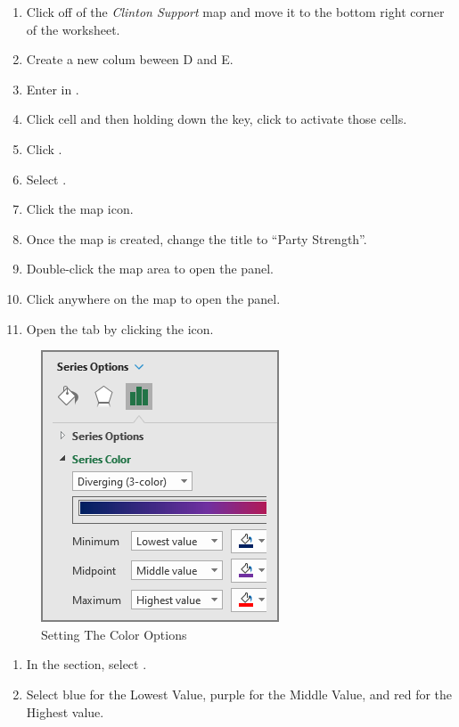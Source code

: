 \begin{enumerate}[resume]
	\item Click off of the \textit{Clinton Support} map and move it to the bottom right corner of the worksheet.
	\item Create a new colum beween D and E.
	\item Enter  in .
	\item Click cell  and then holding down the  key, click  to activate those cells.
	\item Click .
	\item Select .
	\item Click the map icon.
	\item Once the map is created, change the title to ``Party Strength''.
	\item Double-click the map area to open the  panel.
	\item Click anywhere on the map to open the  panel.
	\item Open the  tab by clicking the  icon.
	
\end{enumerate}

\begin{figure}[H]
	\centering
	\includegraphics[width=\maxwidth{.95\linewidth}]{gfx/ch08_fig42}
	\caption{Setting The Color Options}
	\label{08:fig42}
\end{figure}

\begin{enumerate}[resume]	
	\item In the  section, select .
	\item Select blue for the Lowest Value, purple for the Middle Value, and red for the Highest value.
\end{enumerate}

